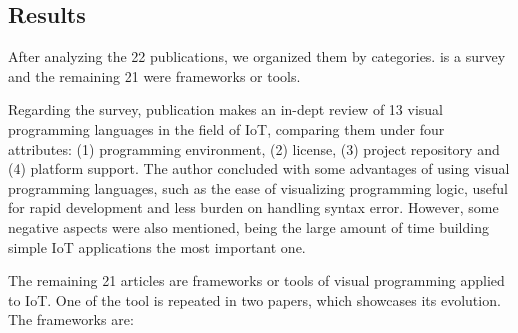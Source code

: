 \subsection{Results}\label{sec:slr_results}

After analyzing the 22 publications, we organized them by categories. \cite{survey_vpl_iot} is a survey and the remaining 21 were frameworks or tools.

Regarding the survey, publication \cite{survey_vpl_iot} makes an in-dept review of 13 visual programming languages in the field of IoT, comparing them under four attributes: (1) programming environment, (2) license, (3) project repository and (4) platform support. The author concluded with some advantages of using visual programming languages, such as the ease of visualizing programming logic, useful for rapid development and less burden on handling syntax error. However, some negative aspects were also mentioned, being the large amount of time building simple IoT applications the most important one.

The remaining 21 articles are frameworks or tools of visual programming applied to IoT. One of the tool is repeated in two papers, which showcases its evolution. The frameworks are:

